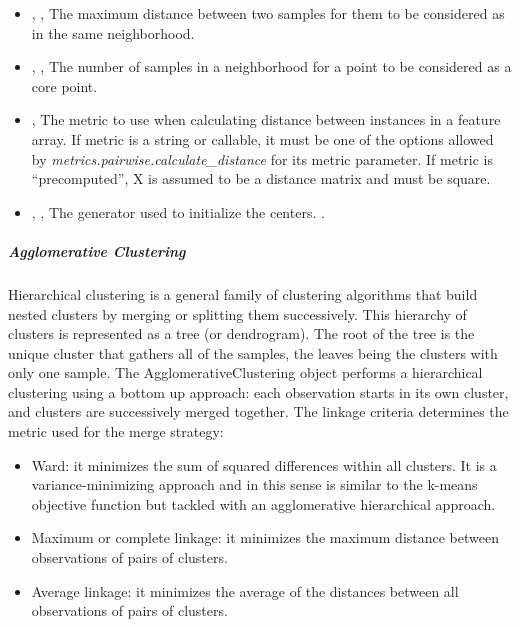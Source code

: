 \begin{itemize}
	\item {}, , The maximum
	distance between two samples for them to be considered as in the
	 same neighborhood. 
	\item {}, ,
	The number of samples in a neighborhood for a point to be
	considered as a core point. 
	\item {}, 
	The metric to use when calculating distance between instances in
	 a feature array. If metric is a string or callable, it must be one
	of the options allowed by \textit{metrics.pairwise.calculate\_distance}
	 for its metric parameter. If metric is “precomputed”, X is assumed
	 to be a distance matrix and must be square. 
	\item {}, , The generator used to initialize the centers.
	.
\end{itemize}

\subparagraph{Agglomerative Clustering } \hfill
\label{subparagraph:agglomerative}

Hierarchical clustering is a general family of clustering algorithms that build nested clusters by merging or splitting them successively.
This hierarchy of clusters is represented as a tree (or dendrogram).
The root of the tree is the unique cluster that gathers all of the samples, the leaves being the clusters with only one sample.
The AgglomerativeClustering object performs a hierarchical clustering using a bottom up approach: each observation starts in its own cluster,
and clusters are successively merged together. The linkage criteria determines the metric used for the merge strategy:
\begin{itemize}
  \item Ward: it minimizes the sum of squared differences within all clusters. It is a variance-minimizing approach and in this sense
is similar to the k-means objective function but tackled with an agglomerative hierarchical approach.
  \item Maximum or complete linkage: it minimizes the maximum distance between observations of pairs of clusters.
  \item Average linkage: it minimizes the average of the distances between all observations of pairs of clusters.
\end{itemize}

